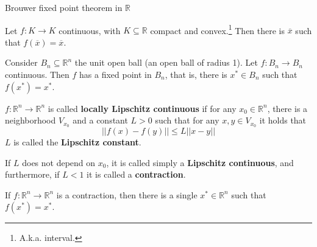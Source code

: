 \documentclass[aspectratio=169, handout]{beamer}
\begin{document}
\begin{frame}{Brouwer fixed point theorem in $\mathds{R}$}

    \begin{theorem}
    Let $f:K\rightarrow K$ continuous, with $K\subseteq\mathds{R}$ compact and convex.\footnote{A.k.a. interval.} Then there is $\overline{x}$ such that $f(\overline{x})=\overline{x}$.
    \end{theorem}
\end{frame}

\begin{frame}
    \begin{theorem}
        Consider $B_n\subseteq\mathds{R}^n$ the unit open ball (an open ball of radius 1). Let $f:B_n\rightarrow B_n$ continuous. Then $f$ has a fixed point in $B_n$, that is, there is $x^*\in B_n$ such that $f(x^*)=x^*$.
    \end{theorem}
    
\end{frame}


\begin{frame}
    \begin{definition}
        $f:\mathds{R}^n\rightarrow\mathds{R}^n$ is called \textbf{locally Lipschitz continuous} if for any $x_0\in\mathds{R}^n$, there is a neighborhood $V_{x_0}$ and a constant $L>0$ such that for any $x,y\in V_{x_0}$ it holds that $$||f(x)-f(y)||\leq L ||x-y||$$ $L$ is called the \textbf{Lipschitz constant}.
        
        If $L$ does not depend on $x_0$, it is called simply a \textbf{Lipschitz continuous}, and furthermore, if $L<1$ it is called a \textbf{contraction}.
    \end{definition}
\end{frame}

\begin{frame}
\begin{theorem}
    If $f:\mathds{R}^n\rightarrow\mathds{R}^n$ is a contraction, then there is a single $x^*\in\mathds{R}^n$ such that $f(x^*)=x^*$.
\end{theorem}
\end{frame}
\end{document}
